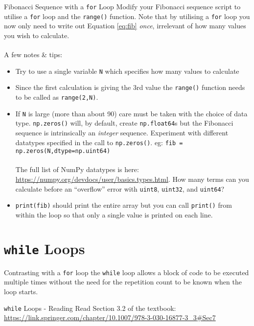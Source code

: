 \documentclass{lab}
\begin{document}
\begin{task}{Fibonacci Sequence with a \texttt{for} Loop}{}
Modify your Fibonacci sequence script to utilise a \texttt{for} loop and the \texttt{range()} function. Note that by utilising a \texttt{for} loop you now only need to write out Equation \ref{eq:fib} \textit{once}, irrelevant of how many values you wish to calculate.
\\~\\
A few notes \& tips:
\begin{itemize}
\item Try to use a single variable \texttt{N} which specifies how many values to calculate
\item Since the first calculation is giving the 3rd value the \texttt{range()} function needs to be called as \texttt{range(2,N)}.
\item If \texttt{N} is large (more than about 90) care must be taken with the choice of data type. \texttt{np.zeros()} will, by default, create \texttt{np.float64}s but the Fibonacci sequence is intrinsically an \textit{integer} sequence. Experiment with different datatypes specified in the call to \texttt{np.zeros()}. eg: \texttt{fib = np.zeros(N,dtype=np.uint64)}\\~\\The full list of NumPy datatypes is here: \url{https://numpy.org/devdocs/user/basics.types.html}. How many terms can you calculate before an ``overflow'' error with \texttt{uint8}, \texttt{uint32}, and \texttt{uint64}?
\item \texttt{print(fib)} should print the entire array but you can call \texttt{print()} from within the loop so that only a single value is printed on each line.
\end{itemize}
\end{task}

\section{\texttt{while} Loops}

Contrasting with a \texttt{for} loop the \texttt{while} loop allows a block of code to be executed multiple times without the need for the repetition count to be known when the loop starts.

\begin{task}{\texttt{while} Loops - Reading}{}
Read Section 3.2 of the textbook: \url{https://link.springer.com/chapter/10.1007/978-3-030-16877-3_3#Sec7}
\end{task}
\end{document}

